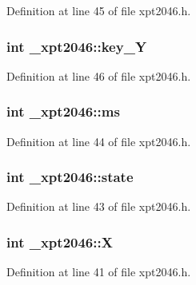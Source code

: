 Definition at line 45 of file xpt2046.\+h.

\subsubsection[{\texorpdfstring{key\+\_\+Y}{key_Y}}]{\setlength{\rightskip}{0pt plus 5cm}int \+\_\+xpt2046\+::key\+\_\+Y}\hypertarget{struct__xpt2046_af232621c9dbc271e0829d2be96862596}{}\label{struct__xpt2046_af232621c9dbc271e0829d2be96862596}


Definition at line 46 of file xpt2046.\+h.

\subsubsection[{\texorpdfstring{ms}{ms}}]{\setlength{\rightskip}{0pt plus 5cm}int \+\_\+xpt2046\+::ms}\hypertarget{struct__xpt2046_a7ada38c703d34310580fbdb4625a5190}{}\label{struct__xpt2046_a7ada38c703d34310580fbdb4625a5190}


Definition at line 44 of file xpt2046.\+h.

\subsubsection[{\texorpdfstring{state}{state}}]{\setlength{\rightskip}{0pt plus 5cm}int \+\_\+xpt2046\+::state}\hypertarget{struct__xpt2046_a271e59b1fe899e8d1199f617bd381b15}{}\label{struct__xpt2046_a271e59b1fe899e8d1199f617bd381b15}


Definition at line 43 of file xpt2046.\+h.

\subsubsection[{\texorpdfstring{X}{X}}]{\setlength{\rightskip}{0pt plus 5cm}int \+\_\+xpt2046\+::X}\hypertarget{struct__xpt2046_a0ec6de4636a5f747e363186ff347039f}{}\label{struct__xpt2046_a0ec6de4636a5f747e363186ff347039f}


Definition at line 41 of file xpt2046.\+h.



